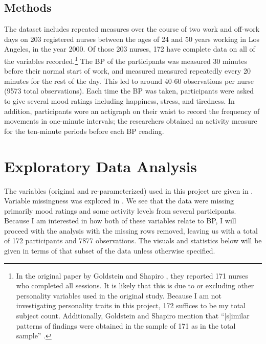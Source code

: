\documentclass[12pt,twoside,letterpaper]{article}
\theoremstyle{definition}
\theoremstyle{definition}
\begin{document}
\subsection{Methods}\label{sec: method}

The dataset includes repeated measures over the course of two work and off-work days on 203 registered nurses between the ages of 24 and 50 years working in Los Angeles, in the year 2000. Of those 203 nurses, 172 have complete data on all of the variables recorded.\footnote{In the original paper by Goldstein and Shapiro , they reported 171 nurses who completed all sessions. It is likely that this is due to \citet{roback_beyond_2021} or \citet{weiss_modeling_2005} excluding other personality variables used in the original study. Because I am not investigating personality traits in this project, 172 suffices to be my total subject count. Additionally, Goldstein and Shapiro mention that ``[s]imilar patterns of findings were obtained in the sample of 171 as in the total sample'' .} The BP of the participants was measured 30 minutes before their normal start of work, and measured measured repeatedly every 20 minutes for the rest of the day. This led to around 40-60 observations per nurse (9573 total observations). Each time the BP was taken, participants were asked to give several mood ratings including happiness, stress, and tiredness. In addition, participants wore an actigraph on their waist to record the frequency of movements in one-minute intervals; the researchers obtained an activity measure for the ten-minute periods before each BP reading.

\section{Exploratory Data Analysis}\label{sec: eda}

The variables (original and re-parameterized) used in this project are given in . Variable missingness was explored in . We see that the data were missing primarily mood ratings and some activity levels from several participants. Because I am interested in how both of these variables relate to BP, I will proceed with the analysis with the missing rows removed, leaving us with a total of 172 participants and 7877 observations. The visuals and statistics below will be given in terms of that subset of the data unless otherwise specified.
\end{document}

